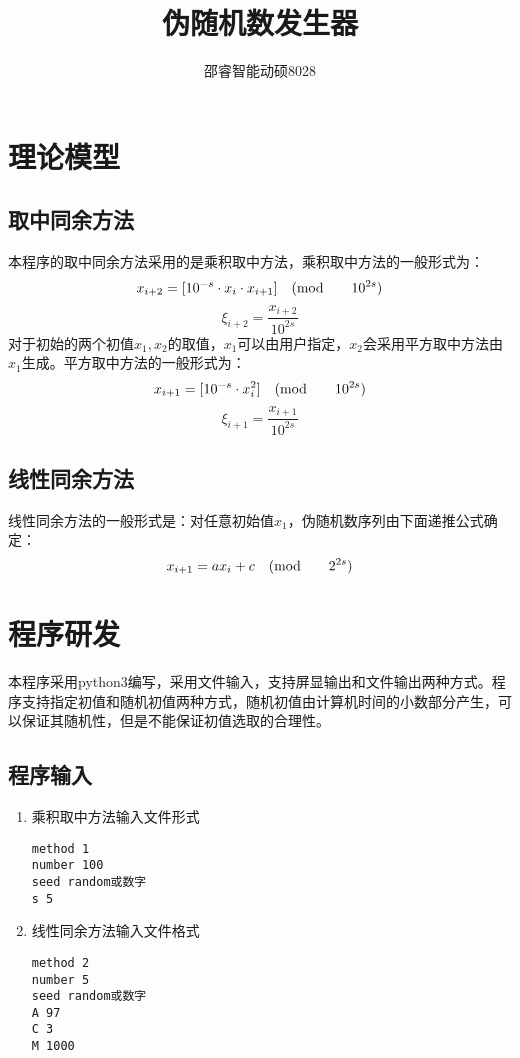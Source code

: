 \documentclass[a4paper,12pt]{ctexart}
\title{伪随机数发生器}
\author{邵睿智\quad 能动硕8028\quad 3118103277}
\date{}
\begin{document}
\maketitle
\section{理论模型}
\subsection{取中同余方法}
本程序的取中同余方法采用的是乘积取中方法，乘积取中方法的一般形式为：
\begin{equation}
x_{i+2}=[10^{-s} \cdot x_i \cdot x_{i+1}] \quad ({\rm mod} \qquad 10^{2s})
\end{equation}
\begin{equation}
\xi_{i+2}=\frac{x_{i+2}}{10^{2s}}
\end{equation}
对于初始的两个初值$x_1,x_2$的取值，$x_1$可以由用户指定，$x_2$会采用平方取中方法由$x_1$生成。平方取中方法的一般形式为：
\begin{equation}
x_{i+1}=[10^{-s} \cdot x_i^2] \quad ({\rm mod} \qquad 10^{2s}) \\
\end{equation}
\begin{equation}
\xi_{i+1}=\frac{x_{i+1}}{10^{2s}}
\end{equation}

\subsection{线性同余方法}
线性同余方法的一般形式是：对任意初始值$x_1$，伪随机数序列由下面递推公式确定：
\begin{equation}
x_{i+1}=ax_i+c \quad ({\rm mod} \qquad 2^{2s})
\end{equation}

\section{程序研发}
本程序采用python3编写，采用文件输入，支持屏显输出和文件输出两种方式。程序支持指定初值和随机初值两种方式，随机初值由计算机时间的小数部分产生，可以保证其随机性，但是不能保证初值选取的合理性。
\subsection{程序输入}
\begin{enumerate}
\item 乘积取中方法输入文件形式
\begin{lstlisting}[title=乘积取中方法输入,frame=shadowbox]
method 1
number 100
seed random或数字
s 5
\end{lstlisting}

\item 线性同余方法输入文件格式
\begin{lstlisting}[title=线性同余方法输入,frame=shadowbox]
method 2
number 5
seed random或数字
A 97
C 3 
M 1000
\end{lstlisting}
\end{enumerate}
\end{document}
